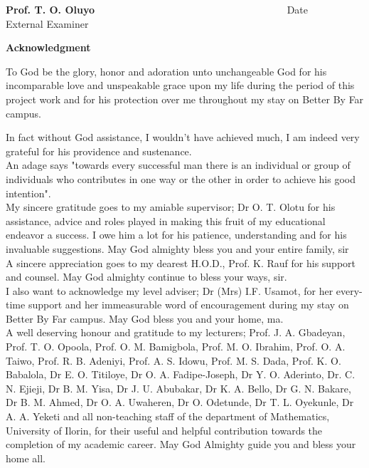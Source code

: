 \documentclass[a4paper, 12pt]{report}
\begin{document}
{\small \textbf{Prof. T. O. Oluyo} $\quad\qquad\quad\qquad\qquad\qquad\qquad\qquad\qquad\qquad\quad$Date\\
External Examiner
			
\np
\begin{center}      \textbf{\upshape Acknowledgment } 		             \end{center}
To God be the glory, honor and adoration unto unchangeable God for his incomparable love and unspeakable grace upon my life during the period of this project work and for his protection over me throughout my stay on Better By Far campus.

In fact without God assistance, I wouldn't have achieved much, I am indeed very grateful for his providence and sustenance.\\

An adage says "towards every successful man there is an individual or group of individuals who contributes in one way or the other in order to achieve his good intention".\\

My sincere gratitude goes to my amiable supervisor; Dr O. T. Olotu for his assistance, advice and roles played in making this fruit of my educational endeavor a success. I owe him a lot for his patience, understanding and for his invaluable suggestions. May God almighty bless you and your entire family, sir\\

A sincere appreciation goes to my dearest H.O.D., Prof. K. Rauf for his support and counsel. May God almighty continue to bless your ways, sir.\\

I also want to acknowledge my level adviser; Dr (Mrs) I.F. Usamot, for her every-time support and her immeasurable word of encouragement during my stay on Better By Far campus. May God bless you and your home, ma.\\

A well deserving honour and gratitude to my lecturers; Prof. J. A. Gbadeyan, Prof. T. O. Opoola, Prof. O. M. Bamigbola, Prof. M. O. Ibrahim, Prof. O. A. Taiwo, Prof. R. B. Adeniyi, Prof. A. S. Idowu, Prof. M. S. Dada, Prof. K. O. Babalola, Dr E. O. Titiloye, Dr O. A. Fadipe-Joseph, Dr Y. O. Aderinto, Dr. C. N. Ejieji, Dr B. M. Yisa, Dr J. U. Abubakar, Dr K. A. Bello, Dr G. N. Bakare, Dr B. M. Ahmed, Dr O. A. Uwaheren, Dr O. Odetunde, Dr T. L. Oyekunle, Dr A. A. Yeketi and all non-teaching staff of the department of Mathematics, University of Ilorin, for their useful and helpful contribution towards the completion of my academic career. May God Almighty guide you and bless your home all.\\

}
\end{document}
